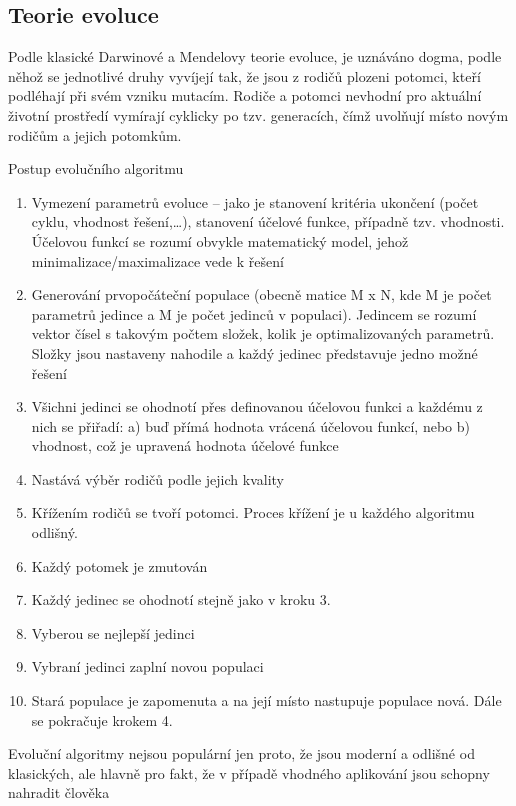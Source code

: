 \documentclass[bc,male,java,dept460]{diploma}		%
\begin{document}
\subsection{Teorie evoluce}
Podle klasické Darwinové a Mendelovy teorie evoluce, je uznáváno dogma, podle něhož se jednotlivé druhy vyvíjejí tak, že jsou z rodičů plozeni potomci, kteří podléhají při svém vzniku mutacím. Rodiče a potomci nevhodní pro aktuální životní prostředí vymírají cyklicky po tzv. generacích, čímž uvolňují místo novým rodičům a jejich potomkům.

\begin{example}
\label{priklad}
Postup evolučního algoritmu
\begin{enumerate}
\item Vymezení parametrů evoluce – jako je stanovení kritéria ukončení (počet cyklu, vhodnost řešení,…), stanovení účelové funkce, případně tzv. vhodnosti. Účelovou funkcí se rozumí obvykle matematický model, jehož minimalizace/maximalizace vede k řešení
\item Generování prvopočáteční populace (obecně matice M x N, kde M je počet parametrů jedince a M je počet jedinců v populaci). Jedincem se rozumí vektor čísel s takovým počtem složek, kolik je optimalizovaných parametrů. Složky jsou nastaveny nahodile a každý jedinec představuje jedno možné řešení
\item Všichni jedinci se ohodnotí přes definovanou účelovou funkci a každému z nich se přiřadí: a) buď přímá hodnota vrácená účelovou funkcí, nebo b) vhodnost, což je upravená hodnota účelové funkce
\item Nastává výběr rodičů podle jejich kvality
\item Křížením rodičů se tvoří potomci. Proces křížení je u každého algoritmu odlišný.
\item Každý potomek je zmutován
\item Každý jedinec se ohodnotí stejně jako v kroku 3.
\item Vyberou se nejlepší jedinci
\item Vybraní jedinci zaplní novou populaci
\item Stará populace je zapomenuta a na její místo nastupuje populace nová. Dále se pokračuje krokem 4.
\end{enumerate}
Evoluční algoritmy nejsou populární jen proto, že jsou moderní a odlišné od klasických, ale hlavně pro fakt, že v případě vhodného aplikování jsou schopny nahradit člověka
\end{example}
\end{document}
